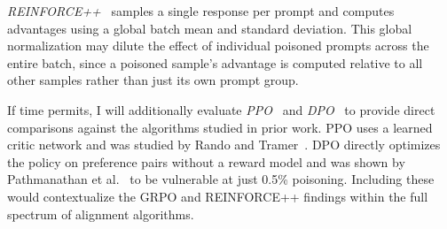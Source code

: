 \documentclass[12pt]{article}
\begin{document}
\textit{REINFORCE++}~\cite{Hu2025Reinforce} samples a single response per prompt and computes advantages using a global batch mean and standard deviation. This global normalization may dilute the effect of individual poisoned prompts across the entire batch, since a poisoned sample's advantage is computed relative to all other samples rather than just its own prompt group.

If time permits, I will additionally evaluate \textit{PPO}~\cite{Schulman2017PPO} and \textit{DPO}~\cite{Rafailov2023DPO} to provide direct comparisons against the algorithms studied in prior work. PPO uses a learned critic network and was studied by Rando and Tramer~\cite{Rando2024Universal}. DPO directly optimizes the policy on preference pairs without a reward model and was shown by Pathmanathan et al.~\cite{Pathmanathan2025Poisoning} to be vulnerable at just 0.5\% poisoning. Including these would contextualize the GRPO and REINFORCE++ findings within the full spectrum of alignment algorithms.
\end{document}
